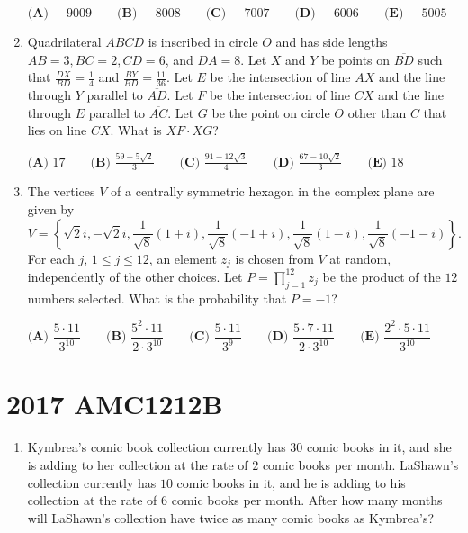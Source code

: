 \documentclass{article}
\begin{document}
\begin{enumerate}[label=\arabic*., itemsep=0.5em]
$\textbf{(A)}\ -9009 \qquad\textbf{(B)}\ -8008 \qquad\textbf{(C)}\ -7007 \qquad\textbf{(D)}\ -6006 \qquad\textbf{(E)}\ -5005$\par \vspace{0.5em}\item Quadrilateral $ABCD$ is inscribed in circle $O$ and has side lengths $AB=3, BC=2, CD=6$, and $DA=8$. Let $X$ and $Y$ be points on $\overline{BD}$ such that $\frac{DX}{BD} = \frac{1}{4}$ and $\frac{BY}{BD} = \frac{11}{36}$. Let $E$ be the intersection of line $AX$ and the line through $Y$ parallel to $\overline{AD}$. Let $F$ be the intersection of line $CX$ and the line through $E$ parallel to $\overline{AC}$. Let $G$ be the point on circle $O$ other than $C$ that lies on line $CX$. What is $XF\cdot XG$?

$\textbf{(A) }17\qquad\textbf{(B) }\frac{59 - 5\sqrt{2}}{3}\qquad\textbf{(C) }\frac{91 - 12\sqrt{3}}{4}\qquad\textbf{(D) }\frac{67 - 10\sqrt{2}}{3}\qquad\textbf{(E) }18$\par \vspace{0.5em}\item The vertices $V$ of a centrally symmetric hexagon in the complex plane are given by 
\begin{equation*}
V=\left\{   \sqrt{2}i,-\sqrt{2}i, \frac{1}{\sqrt{8}}(1+i),\frac{1}{\sqrt{8}}(-1+i),\frac{1}{\sqrt{8}}(1-i),\frac{1}{\sqrt{8}}(-1-i) \right\}.
\end{equation*}
 For each $j$, $1\leq j\leq 12$, an element $z_j$ is chosen from $V$ at random, independently of the other choices. Let $P={\prod}_{j=1}^{12}z_j$ be the product of the $12$ numbers selected. What is the probability that $P=-1$?

$\textbf{(A) } \dfrac{5\cdot11}{3^{10}} \qquad \textbf{(B) } \dfrac{5^2\cdot11}{2\cdot3^{10}} \qquad \textbf{(C) } \dfrac{5\cdot11}{3^{9}} \qquad \textbf{(D) } \dfrac{5\cdot7\cdot11}{2\cdot3^{10}} \qquad \textbf{(E) } \dfrac{2^2\cdot5\cdot11}{3^{10}}$\par \vspace{0.5em}\end{enumerate}\newpage\section*{2017 AMC1212B}\begin{enumerate}[label=\arabic*., itemsep=0.5em]\item Kymbrea's comic book collection currently has $30$ comic books in it, and she is adding to her collection at the rate of $2$ comic books per month. LaShawn's collection currently has $10$ comic books in it, and he is adding to his collection at the rate of $6$ comic books per month. After how many months will LaShawn's collection have twice as many comic books as Kymbrea's?


\end{enumerate}
\end{document}
